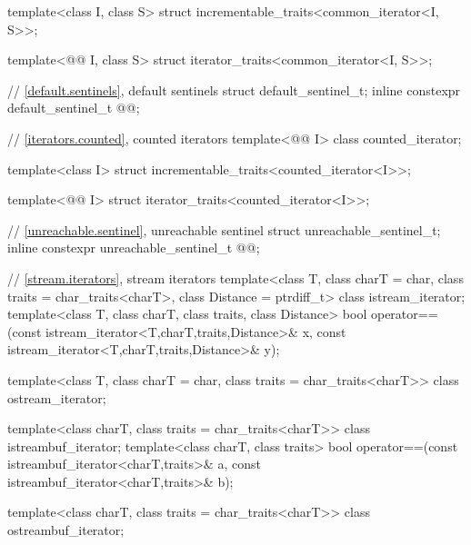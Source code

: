 \begin{codeblock}
{  template<class I, class S>
    struct incrementable_traits<common_iterator<I, S>>;

  template<@@ I, class S>
    struct iterator_traits<common_iterator<I, S>>;

  // \ref{default.sentinels}, default sentinels
  struct default_sentinel_t;
  inline constexpr default_sentinel_t @@{};

  // \ref{iterators.counted}, counted iterators
  template<@@ I> class counted_iterator;

  template<class I>
    struct incrementable_traits<counted_iterator<I>>;

  template<@@ I>
    struct iterator_traits<counted_iterator<I>>;

  // \ref{unreachable.sentinel}, unreachable sentinel
  struct unreachable_sentinel_t;
  inline constexpr unreachable_sentinel_t @@{};

  // \ref{stream.iterators}, stream iterators
  template<class T, class charT = char, class traits = char_traits<charT>,
           class Distance = ptrdiff_t>
  class istream_iterator;
  template<class T, class charT, class traits, class Distance>
    bool operator==(const istream_iterator<T,charT,traits,Distance>& x,
            const istream_iterator<T,charT,traits,Distance>& y);

  template<class T, class charT = char, class traits = char_traits<charT>>
      class ostream_iterator;

  template<class charT, class traits = char_traits<charT>>
    class istreambuf_iterator;
  template<class charT, class traits>
    bool operator==(const istreambuf_iterator<charT,traits>& a,
            const istreambuf_iterator<charT,traits>& b);

  template<class charT, class traits = char_traits<charT>>
    class ostreambuf_iterator;

}
\end{codeblock}
